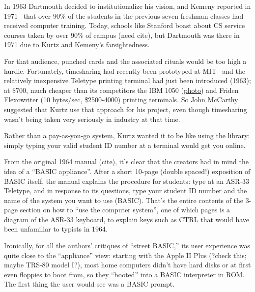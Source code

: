 \documentclass{article}
\begin{document}
In 1963 Dartmouth decided to
institutionalize his vision, and Kemeny reported in
1971~\cite{man_and_computer} that
over 90\% of the students in the previous seven freshman classes had
received computer training.  Today, schools like Stanford boast about
CS service courses taken by over 90\% of campus (need cite), but
Dartmouth was there in 1971 due to Kurtz and Kemeny's farsightedness.

For that audience, punched cards and the associated rituals would be too
high a hurdle.
Fortunately, timesharing had recently been prototyped at
MIT~\cite{corbato62timesharing} and the relatively inexpensive Teletype
 printing terminal had just been introduced (1963); at \$700,
much cheaper than its competitors the IBM 1050
(\href{http://www.science.uva.nl/museum/ibm1050.php}{photo}) and
Friden Flexowriter (10 bytes/sec,
\href{http://retrotechnology.com/herbs_stuff/flex_behr.html}{\$2500-4000})
printing terminals.
So John McCarthy suggested that Kurtz use that approach for his project,
even though timesharing wasn't being taken very seriously in industry at
that time.

Rather than a
pay-as-you-go system, Kurtz wanted it to be like using the library:
simply typing your valid student ID number at a terminal would get you
online.

From the original 1964 manual (cite), it's clear that the creators had
in mind the idea of a ``BASIC appliance''.  After a short 10-page
(double spaced!) exposition of BASIC itself, the manual
explains the procedure for students: type  at an ASR-33
Teletype, and in response to its questions, type your student ID number
and the name of the system you want to use (BASIC).  That's the entire
contents of the  3-page section on how to ``use the computer system'',
one of which pages is a diagram of the ASR-33 keyboard,
to explain keys such as CTRL that would have been unfamiliar to
typists in 1964.

Ironically, for all the authors' critiques of ``street BASIC,'' its user
experience was quite close to the ``appliance'' view: starting with the
Apple II Plus (?check this; maybe TRS-80 model I?), most home computers
didn't have hard disks or at first even floppies to boot from, so they
``booted'' into a BASIC interpreter in ROM.  The first thing the user
would see was a BASIC prompt. 

\end{document}
